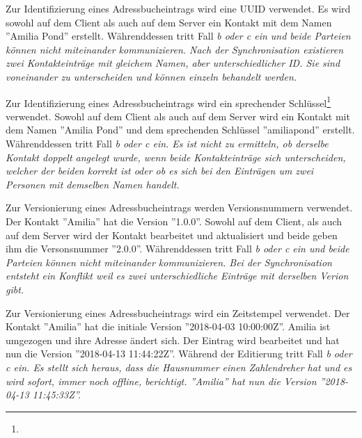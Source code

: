 \begin{description}[leftmargin=0.5cm,style=nextline]
  \item[Methode ID0 -- UUID:]
    Zur Identifizierung eines Adressbucheintrags wird eine \gls{UUID} verwendet. Es wird sowohl auf dem Client als auch auf dem Server ein Kontakt mit dem Namen ''Amilia Pond'' erstellt.
    Währenddessen tritt Fall \it{b} oder \it{c} ein und beide Parteien können nicht miteinander kommunizieren. Nach der Synchronisation existieren zwei Kontakteinträge mit gleichem Namen, aber unterschiedlicher ID.
    Sie sind voneinander zu unterscheiden und können einzeln behandelt werden.\\
%
  \item[Methode ID1 -- sprechender Schlüssel:]
    Zur Identifizierung eines Adressbucheintrags wird ein sprechender Schlüssel\footnote{\naturalkey} verwendet.
    Sowohl auf dem Client als auch auf dem Server wird ein Kontakt mit dem Namen ''Amilia Pond'' und dem sprechenden Schlüssel ''amiliapond'' erstellt.
    Währenddessen tritt Fall \it{b} oder \it{c} ein.
    Es ist nicht zu ermitteln, ob derselbe Kontakt doppelt angelegt wurde, wenn beide Kontakteinträge sich unterscheiden, welcher der beiden korrekt ist oder ob es sich bei den Einträgen um zwei Personen mit demselben Namen handelt.\\
  \item[Methode V0 -- Versionsnummer:]
    Zur Versionierung eines Adressbucheintrags werden Versionsnummern verwendet. Der Kontakt ''Amilia'' hat die Version ''1.0.0''.
    Sowohl auf dem Client, als auch auf dem Server wird der Kontakt bearbeitet und aktualisiert und beide geben ihm die Versonsnummer ''2.0.0''.
    Währenddessen tritt Fall \it{b} oder \it{c} ein und beide Parteien können nicht miteinander kommunizieren.
    Bei der Synchronisation entsteht ein Konflikt weil es zwei unterschiedliche Einträge mit derselben Verion gibt.\\
  \item[Methode V1 -- Zeitstempel:]
    Zur Versionierung eines Adressbucheintrags wird ein Zeitstempel verwendet. Der Kontakt ''Amilia'' hat die initiale Version ''2018-04-03 10:00:00Z''.
    Amilia ist umgezogen und ihre Adresse ändert sich. Der Eintrag wird bearbeitet und hat nun die Version ''2018-04-13 11:44:22Z''.
    Während der Editierung tritt Fall \it{b} oder \it{c} ein.
    Es stellt sich heraus, dass die Hausnummer einen Zahlendreher hat und es wird sofort, immer noch offline, berichtigt. ''Amilia'' hat nun die Version ''2018-04-13 11:45:33Z''.\\

\end{description}
